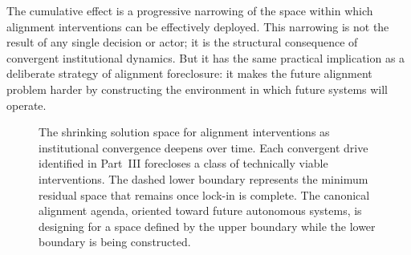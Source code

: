 \documentclass[12pt, oneside]{book}
\theoremstyle{plain}
\theoremstyle{definition}
\theoremstyle{remark}
\theoremstyle{definition}
\begin{document}
The cumulative effect is a progressive narrowing of the space within which alignment
interventions can be effectively deployed. This narrowing is not the result of any
single decision or actor; it is the structural consequence of convergent institutional
dynamics. But it has the same practical implication as a deliberate strategy of
alignment foreclosure: it makes the future alignment problem harder by constructing
the environment in which future systems will operate.

\begin{figure}[ht]
\centering
{}
\caption{The shrinking solution space for alignment interventions as institutional
convergence deepens over time. Each convergent drive identified in Part~III forecloses
a class of technically viable interventions. The dashed lower boundary represents
the minimum residual space that remains once lock-in is complete. The canonical
alignment agenda, oriented toward future autonomous systems, is designing for a
space defined by the upper boundary while the lower boundary is being constructed.}
\label{fig:shrinking}
\end{figure}
\end{document}

